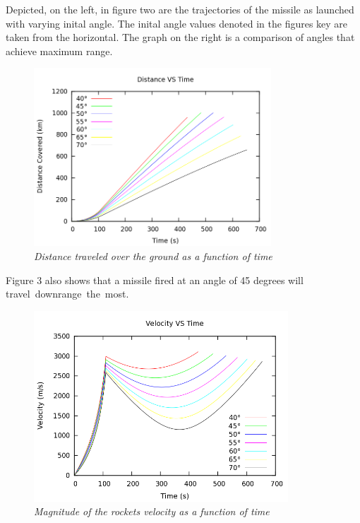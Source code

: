 \documentclass[11pt]{article}
\begin{document}
Depicted, on the left, in figure two are the trajectories of the missile as launched with varying inital angle.  
The inital angle values denoted in the figures key are taken from the horizontal.  The graph on the right is a 
comparison of angles that achieve maximum range.

\begin{figure}[H]
  \begin{center}
\centerline{\includegraphics[width=3.5in]{xdistance.png}}
\caption{\it \small{Distance traveled over the ground as a function of time \label{fig3}}}
  \end{center}
\end{figure}

Figure 3 also shows that a missile fired at an angle of 45 degrees will travel~downrange~the~most.

\begin{figure}[H]
  \begin{center}
\centerline{\includegraphics[width=3.75in]{velocity.png}}
\caption{\it \small{Magnitude of the rockets velocity as a function of time \label{fig4}}}
  \end{center}
\end{figure}
\end{document}
